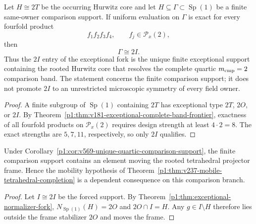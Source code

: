 \documentclass[11pt]{article}
\begin{document}
\begin{corollary}
\label{p1:cor:v569-unique-quartic-comparison-support}
Let $H\cong2T$ be the occurring Hurwitz core and let
$H\subseteq\Gamma\subset\operatorname{Sp}(1)$ be a finite same-owner
comparison support.  If uniform evaluation on $\Gamma$ is exact for every
fourfold product
\[
 f_1f_2f_3f_4,\qquad f_j\in\mathcal P_x(2),
\]
then
\[
 \boxed{\Gamma\cong2I.}
\]
Thus the $2I$ entry of the exceptional fork is the unique finite exceptional
support containing the rooted Hurwitz core that resolves the complete quartic
$m_{\rm cmp}=2$ comparison band.  The statement concerns the finite
comparison support; it does not promote $2I$ to an unrestricted microscopic
symmetry of every field owner.
\end{corollary}
\begin{proof}
A finite subgroup of $\operatorname{Sp}(1)$ containing $2T$ has exceptional
type $2T$, $2O$, or $2I$.  By
Theorem~\ref{p1:thm:v181-exceptional-complete-band-frontier}, exactness of
all fourfold products on $\mathcal P_x(2)$ requires design strength at least
$4\cdot2=8$.  The exact strengths are $5,7,11$, respectively, so only $2I$
qualifies.
\end{proof}

\begin{corollary}
\label{p1:cor:v569-comparison-support-mobility}
Under Corollary~\ref{p1:cor:v569-unique-quartic-comparison-support}, the
finite comparison support contains an element moving the rooted tetrahedral
projector frame.  Hence the mobility hypothesis of
Theorem~\ref{p1:thm:v237-mobile-tetrahedral-completion} is a dependent
consequence on this comparison branch.
\end{corollary}
\begin{proof}
Let $I\cong2I$ be the forced support.  By
Theorem~\ref{p1:thm:exceptional-normalizer-fork},
$N_{\operatorname{Sp}(1)}(H)=2O$ and $2O\cap I=H$.  Any $g\in I\setminus H$
therefore lies outside the frame stabilizer $2O$ and moves the frame.
\end{proof}
\end{document}
